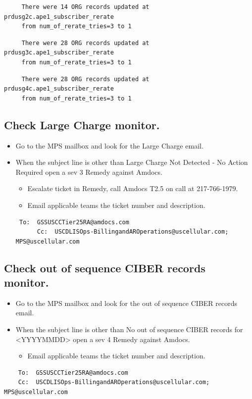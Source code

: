 \documentclass[12pt,twoside]{article}
\begin{document}
\begin{itemize}
\begin{verbatim}
     There were 14 ORG records updated at prdusg2c.ape1_subscriber_rerate 
     from num_of_rerate_tries=3 to 1
\end{verbatim}
 
\begin{verbatim}
     There were 28 ORG records updated at prdusg3c.ape1_subscriber_rerate 
     from num_of_rerate_tries=3 to 1
\end{verbatim}
 
\begin{verbatim}
     There were 28 ORG records updated at prdusg4c.ape1_subscriber_rerate 
     from num_of_rerate_tries=3 to 1
\end{verbatim}
\end{itemize}
\subsection{Check Large Charge monitor.}
\label{sec-4-5}

\begin{itemize}
\item Go to the MPS mailbox and look for the Large Charge email.
\item When the subject line is other than Large Charge Not Detected - No Action Required open a sev 3 Remedy against Amdocs.
\begin{itemize}
\item Escalate ticket in Remedy, call Amdocs T2.5 on call at 217-766-1979.
\item Email applicable teams the ticket number and description.
\end{itemize}
\begin{verbatim}
 To:  GSSUSCCTier25RA@amdocs.com
      Cc:  USCDLISOps-BillingandAROperations@uscellular.com; MPS@uscellular.com
\end{verbatim}
\end{itemize}
\subsection{Check out of sequence CIBER records monitor.}
\label{sec-4-6}

\begin{itemize}
\item Go to the MPS mailbox and look for the out of sequence CIBER records email.
\item When the subject line is other than No out of sequence CIBER records for <YYYYMMDD> open a sev 4 Remedy against Amdocs.
\begin{itemize}
\item Email applicable teams the ticket number and description.
\end{itemize}
\end{itemize}
\begin{verbatim}
    To:  GSSUSCCTier25RA@amdocs.com
    Cc:  USCDLISOps-BillingandAROperations@uscellular.com; MPS@uscellular.com
\end{verbatim}
\end{document}

